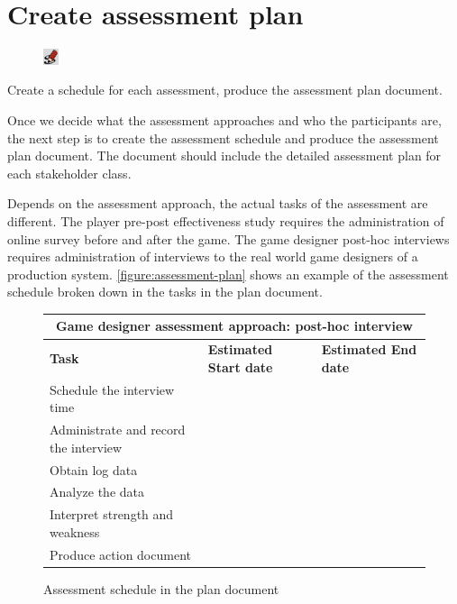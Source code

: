 \documentclass[11pt,oneside]{book}
\newcommand\tabhead[1]{\small\textbf{#1}}
\begin{document}
\section{Create assessment plan}
\begin{shadebox}
\begin{figure}
\vspace{-15pt}\hspace{-10pt}
    \includegraphics[width=0.04\textwidth]{note-icon}
\end{figure}
Create a schedule for each assessment, produce the assessment plan document.
\end{shadebox}

Once we decide what the assessment approaches and who the participants are, the next step is to create the assessment 
schedule and produce the assessment plan document. The document should include the detailed assessment plan for 
each stakeholder class. 

Depends on the assessment approach, the actual tasks of the assessment are different. The player pre-post 
effectiveness study requires the administration of online survey before and after the game. The game designer 
post-hoc interviews requires administration of interviews to the real world game designers of a production 
system. \autoref{figure:assessment-plan} shows an example of the assessment schedule broken down in the tasks 
in the plan document.

\begin{figure}[ht!]
  \centering
  \begin{tabular}{|p{}|p{}|p{}|}
    \hline
    \multicolumn{3}{|c|}{\tabhead{Game designer assessment approach: post-hoc interview}} \\
    \hline
    \tabhead{Task} &
    \tabhead{Estimated Start date} &
    \tabhead{Estimated End date} \\
    \hline
    Schedule the interview time & & \\
    \hline
    Administrate and record the interview & & \\
    \hline
    Obtain log data & & \\
    \hline
    Analyze the data & & \\
    \hline
    Interpret strength and weakness & & \\
    \hline
    Produce action document & & \\
    \hline
  \end{tabular}
  \caption{Assessment schedule in the plan document}
  \label{figure:assessment-plan}
\end{figure}
\end{document}
